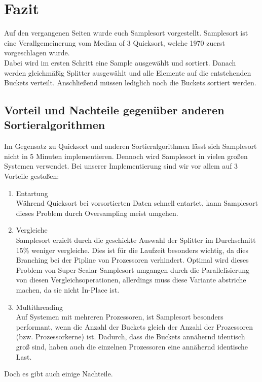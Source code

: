 \section{Fazit}
	Auf den vergangenen Seiten wurde euch Samplesort vorgestellt.
	Samplesort ist eine Verallgemeinerung vom Median of 3 Quicksort, welche 1970 zuerst vorgeschlagen wurde.\\
	Dabei wird im ersten Schritt eine Sample ausgewählt und sortiert.
	Danach werden gleichmäßig Splitter ausgewählt und alle Elemente auf die entstehenden Buckets verteilt.
	Anschließend müssen lediglich noch die Buckets sortiert werden.
	
	\subsection{Vorteil und Nachteile gegenüber anderen Sortieralgorithmen}
		Im Gegensatz zu Quicksort und anderen Sortieralgorithmen lässt sich Samplesort nicht in 5 Minuten implementieren.
		Dennoch wird Samplesort in vielen großen Systemen verwendet.
		Bei unserer Implementierung sind wir vor allem auf 3 Vorteile gestoßen:
		\begin{enumerate}
			\item Entartung\\
				Während Quicksort bei vorsortierten Daten schnell entartet, kann Samplesort dieses Problem durch Oversampling meist umgehen.
			\item Vergleiche\\
				Samplesort erzielt durch die geschickte Auswahl der Splitter im Durchschnitt 15\% weniger vergleiche.
				Dies ist für die Laufzeit besonders wichtig, da dies Branching bei der Pipline von Prozessoren verhindert.
				Optimal wird dieses Problem von Super-Scalar-Samplesort umgangen durch die Parallelisierung von diesen Vergleichsoperationen, allerdings muss diese Variante abstriche machen, da sie nicht In-Place ist.
			\item Multithreading\\
				Auf Systemen mit mehreren Prozessoren, ist Samplesort besonders performant, wenn die Anzahl der Buckets gleich der Anzahl der Prozessoren (bzw. Prozessorkerne) ist.
				Dadurch, dass die Buckets annähernd identisch groß sind, haben auch die einzelnen Prozessoren eine annähernd identische Last.
		\end{enumerate}
		Doch es gibt auch einige Nachteile.
